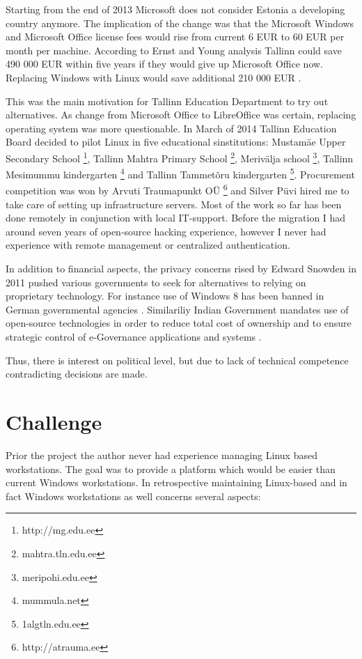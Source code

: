 \documentclass{article}
\begin{document}
Starting from the end of 2013 Microsoft does not consider Estonia a
developing country anymore. The implication of the change was that
the Microsoft Windows and Microsoft Office license fees would rise
from current 6 EUR to 60 EUR per month per machine.
According to Ernst and Young analysis Tallinn could save 490 000 EUR
within five years if they would give up Microsoft Office now.
Replacing Windows with Linux would save additional 210 000 EUR
\cite{ernst-young-report}.

This was the main motivation for Tallinn Education Department to try
out alternatives. As change from Microsoft Office to LibreOffice was
certain, replacing operating system was more questionable.
In March of 2014 Tallinn Education Board decided
to pilot Linux in five educational sinstitutions:
Mustamäe Upper Secondary School
\footnote{http://mg.edu.ee},
Tallinn Mahtra Primary School
\footnote{mahtra.tln.edu.ee},
Merivälja school
\footnote{meripohi.edu.ee},
Tallinn Mesimummu kindergarten
\footnote{mummula.net} and
Tallinn Tammetõru kindergarten
\footnote{1algtln.edu.ee}.
Procurement competition was won by Arvuti Traumapunkt OÜ
\footnote{http://atrauma.ee} and
Silver Püvi hired me to take care of setting up infrastructure servers.
Most of the work so far has been done remotely in conjunction with
local IT-support. Before the migration I had around seven years of
open-source hacking experience, however I never had experience with
remote management or centralized authentication.

In addition to financial aspects, the privacy concerns rised by
Edward Snowden in 2011
\cite{edward-snowden-revelations}
pushed various governments to seek for alternatives
to relying on proprietary technology.
For instance use of Windows 8 has been banned in German governmental agencies
\cite{german-government-bans-windows-8}.
Similariliy Indian Government mandates use of open-source technologies
in order to reduce total cost of ownership and to ensure
strategic control of e-Governance applications and systems
\cite{open-source-adoption-at-government-of-india}.

Thus, there is interest on political level, but due to lack
of technical competence contradicting decisions are made.



\section{Challenge}

Prior the project the author never had experience managing Linux based workstations.
The goal was to provide a platform which would be easier than current Windows
workstations.
In retrospective maintaining Linux-based and in fact
Windows workstations as well concerns several aspects:
\end{document}
